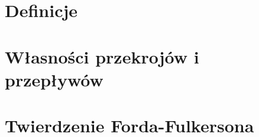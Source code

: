 \section{Definicje}


\section{Własności przekrojów i przepływów}


\section{Twierdzenie Forda-Fulkersona}
